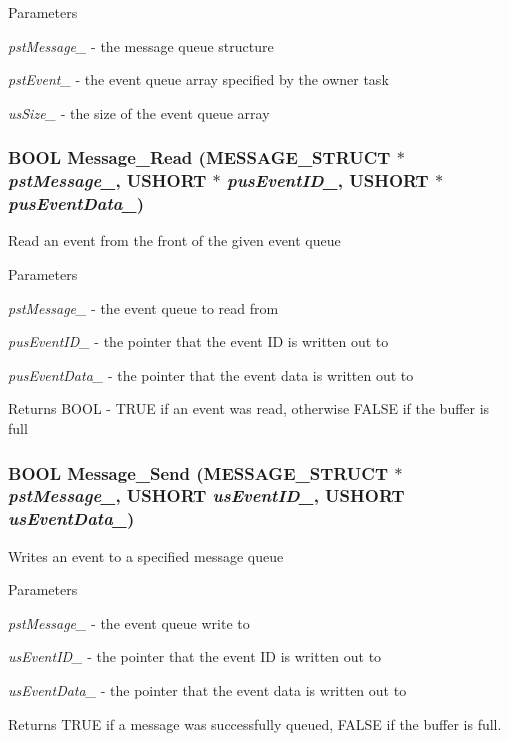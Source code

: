\begin{DoxyParams}{Parameters}
\item[{\em pstMessage\_\-}]-\/ the message queue structure \item[{\em pstEvent\_\-}]-\/ the event queue array specified by the owner task \item[{\em usSize\_\-}]-\/ the size of the event queue array \end{DoxyParams}
\subsubsection[{Message\_\-Read}]{\setlength{\rightskip}{0pt plus 5cm}BOOL Message\_\-Read ({\bf MESSAGE\_\-STRUCT} $\ast$ {\em pstMessage\_\-}, \/  USHORT $\ast$ {\em pusEventID\_\-}, \/  USHORT $\ast$ {\em pusEventData\_\-})}\label{message_8c_a96bd8e59324fd33ba603fea8a57b6dc6}
Read an event from the front of the given event queue


\begin{DoxyParams}{Parameters}
\item[{\em pstMessage\_\-}]-\/ the event queue to read from \item[{\em pusEventID\_\-}]-\/ the pointer that the event ID is written out to \item[{\em pusEventData\_\-}]-\/ the pointer that the event data is written out to \end{DoxyParams}
\begin{DoxyReturn}{Returns}
BOOL -\/ TRUE if an event was read, otherwise FALSE if the buffer is full 
\end{DoxyReturn}
\subsubsection[{Message\_\-Send}]{\setlength{\rightskip}{0pt plus 5cm}BOOL Message\_\-Send ({\bf MESSAGE\_\-STRUCT} $\ast$ {\em pstMessage\_\-}, \/  USHORT {\em usEventID\_\-}, \/  USHORT {\em usEventData\_\-})}\label{message_8c_aa5e03ba4c6f9e1b47f8fc9a7495a4b6e}
Writes an event to a specified message queue


\begin{DoxyParams}{Parameters}
\item[{\em pstMessage\_\-}]-\/ the event queue write to \item[{\em usEventID\_\-}]-\/ the pointer that the event ID is written out to \item[{\em usEventData\_\-}]-\/ the pointer that the event data is written out to \end{DoxyParams}
\begin{DoxyReturn}{Returns}
TRUE if a message was successfully queued, FALSE if the buffer is full. 
\end{DoxyReturn}
